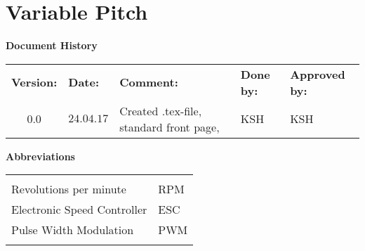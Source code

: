 \cleartoleftpage
{
\Hide
\part{Variable Pitch}
}

\begin{center}
\textbf{\large Document History}\\
\begin{tabular}{cllll}
\rowcolor{cadetgrey}
\textbf{Version:}    &\textbf{Date:} 	 &\textbf{Comment:}    &\textbf{Done by:}   &\textbf{Approved by:}  \\
0.0       & $24.04.17$   & Created .tex-file, standard front page,  & KSH  & KSH \\ 
\end{tabular}                                                                   
\end{center}

\vspace*{3.0 cm}

\begin{center}
\textbf{\large Abbreviations}\\
\begin{tabular}{ll}
\rowcolor{cadetgrey}
    &   \\
Revolutions per minute      & RPM          \\ \rowcolor{gainsboro}
Electronic Speed Controller & ESC \\ 
Pulse Width Modulation  & PWM \\ \rowcolor{gainsboro}

\end{tabular}                                                             
\end{center}

\newpage



\setcounter{section}{0}
\setcounter{secnumdepth}{2}

\startcontents  
\setcounter{tocdepth}{2}
\chapter*{\contentsname}

\vspace*{1cm}

\vspace*{1cm}



% 

% 

% 

% 

% 


\stopcontents
{}

